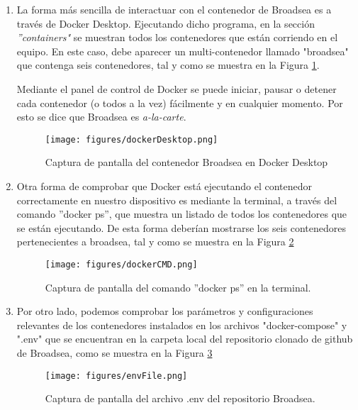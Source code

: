 \begin{enumerate} 

    \item La forma más sencilla de interactuar con el contenedor de Broadsea es a través de Docker Desktop. Ejecutando dicho programa, en la sección \textit{''containers"} se muestran todos los contenedores que están corriendo en el equipo. En este caso, debe aparecer un multi-contenedor llamado "broadsea" que contenga seis contenedores, tal y como se muestra en la Figura \ref{fig:dockerDesktop}.
    
    Mediante el panel de control de Docker se puede iniciar, pausar o detener cada contenedor (o todos a la vez) fácilmente y en cualquier momento. Por esto se dice que Broadsea es \textit{a-la-carte}.
    
\begin{figure}[H]
    \centering
    \texttt{[image: figures/dockerDesktop.png]}
    \caption{Captura de pantalla del contenedor Broadsea en Docker Desktop}
    \label{fig:dockerDesktop}
\end{figure}

    \item Otra forma de comprobar que Docker está ejecutando el contenedor correctamente en nuestro dispositivo es mediante la terminal, a través del comando ''docker ps'', que muestra un listado de todos los contenedores que se están ejecutando. De esta forma deberían mostrarse los seis contenedores pertenecientes a broadsea, tal y como se muestra en la Figura \ref{fig:dockerCMD}

\begin{figure}[H]
    \centering
    \texttt{[image: figures/dockerCMD.png]}
    \caption{Captura de pantalla del comando ''docker ps'' en la terminal.}
    \label{fig:dockerCMD}
\end{figure}
    
    \item Por otro lado, podemos comprobar los parámetros y configuraciones relevantes de los contenedores instalados en los archivos "docker-compose" y ".env" que se encuentran en la carpeta local del repositorio clonado de github de Broadsea, como se muestra en la Figura \ref{fig:envFile}

    \begin{figure}[H]
    \centering
    \texttt{[image: figures/envFile.png]}
    \caption{Captura de pantalla del archivo .env del repositorio Broadsea.}
    \label{fig:envFile}
\end{figure}


\end{enumerate}
